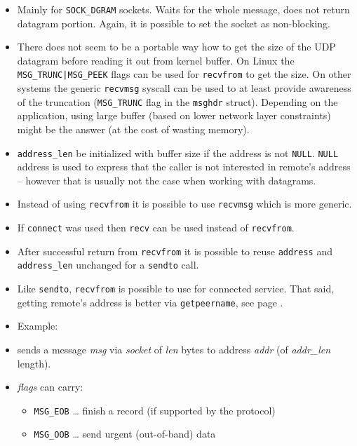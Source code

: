 \begin{itemize}
\item Mainly for \texttt{SOCK\_DGRAM} sockets. Waits for the whole message,
does not return datagram portion. Again, it is possible to set the socket
as non-blocking.
\item There does not seem to be a portable way how to get the size of the
UDP datagram before reading it out from kernel buffer. On Linux the
\texttt{MSG\_TRUNC|MSG\_PEEK} flags can be used for \texttt{recvfrom} to get the
size. On other systems the generic \texttt{recvmsg} syscall can be used to at
least provide awareness of the truncation (\texttt{MSG\_TRUNC} flag in the
\texttt{msghdr} struct).
Depending on the application, using large buffer (based on lower network layer
constraints) might be the answer (at the cost of wasting memory).
\item \texttt{address\_len}  be initialized with buffer size if
the address is not \texttt{NULL}. \texttt{NULL} address is used to express that
the caller is not interested in remote's address -- however that is usually
not the case when working with datagrams.
\item Instead of using \texttt{recvfrom} it is possible to use
\texttt{recvmsg} which is more generic.
\item If \texttt{connect} was used then \texttt{recv} can be used instead of
\texttt{recvfrom}.
\item After successful return from \texttt{recvfrom} it is possible to reuse
\texttt{address} and \texttt{address\_len} unchanged for a \texttt{sendto} call.
\item Like \texttt{sendto}, \texttt{recvfrom} is possible to use for connected
service. That said, getting remote's address is better via
\texttt{getpeername}, see page \pageref{GETPEERNAME}.
\item Example: \label{UDP_SERVER_C} 
\end{itemize}



\begin{slide}
\begin{itemize}
\item sends a message \emph{msg} via \emph{socket} of \emph{l{}en} bytes to
address \emph{addr} (of \emph{addr\_len} length). 
\item \emph{flags} can carry:
    \begin{itemize}
    \item \texttt{MSG\_EOB} \dots{} finish a record (if supported by the
    protocol)
    \item \texttt{MSG\_OOB} \dots{} send urgent (out-of-band) data
    \end{itemize}
\end{itemize}
\end{slide}

